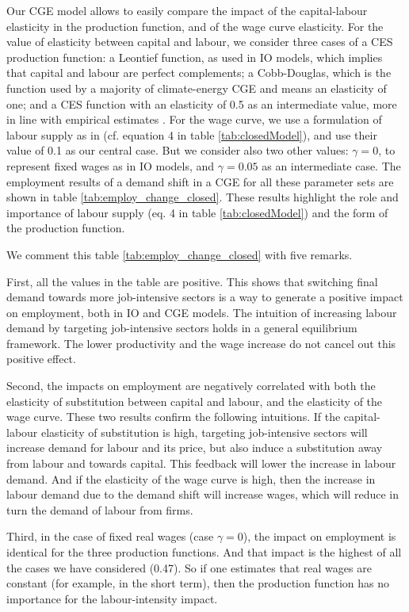 Our CGE model allows to easily compare the impact of the capital-labour elasticity in the production function, and of the wage curve elasticity.
For the value of elasticity between capital and labour, we consider three cases of a CES production function: a Leontief function, as used in IO models, which implies that capital and labour are perfect complements; a Cobb-Douglas, which is the function used by a majority of climate-energy CGE \citep{VanderWerf2008} and means an elasticity of one; and a CES function with an elasticity of 0.5 as an intermediate value, more in line with empirical estimates \citep{VanderWerf2008, Antras2004}.
For the wage curve, we use a formulation of labour supply as in \citet{Blanchflower2005} (cf. equation 4 in table \ref{tab:closedModel}), and use their value of 0.1 as our central case. But we consider also two other values: $\gamma=0$, to represent fixed wages as in IO models, and $\gamma=0.05$ as an intermediate case.
The employment results of a demand shift in a CGE for all these parameter sets are shown in table \ref{tab:employ_change_closed}. These results highlight the role and importance of labour supply (eq. 4 in table \ref{tab:closedModel}) and the form of the production function. 

We comment this table \ref{tab:employ_change_closed} with five remarks.

First, all the values in the table are positive. This shows that switching final demand towards more job-intensive sectors is a way to generate a positive impact on employment, both in IO and CGE models. The intuition of increasing labour demand by targeting job-intensive sectors holds in a general equilibrium framework. The lower productivity and the wage increase do not cancel out this positive effect.

Second, the impacts on employment are negatively correlated with both the elasticity of substitution between capital and labour, and the elasticity of the wage curve. 
These two results confirm the following intuitions.
If the capital-labour  elasticity of substitution is high, targeting job-intensive sectors will increase demand for labour and its price, but also induce a substitution away from labour and towards capital. This feedback will lower the increase in labour demand. 
And if the elasticity of the wage curve is high, then the increase in labour demand due to the demand shift will increase wages, which will reduce in turn the demand of labour from firms.  

Third, in the case of fixed real wages (case $\gamma=0$), the impact on employment is identical for the three production functions. And that impact is the highest of all the cases we have considered (0.47). So if one estimates that real wages are constant (for example, in the short term), then the production function has no importance for the labour-intensity impact.

